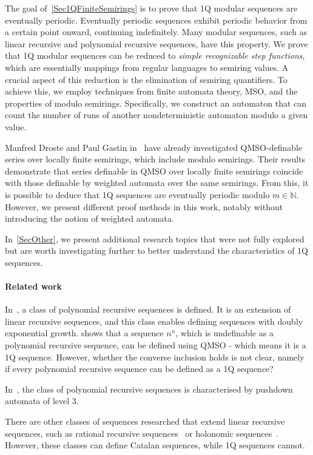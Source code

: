 \documentclass[en]{pracamgr}
\theoremstyle{definition}
\begin{document}
The goal of~\cref{Sec1QFiniteSemirings} is to prove that 1Q modular sequences are eventually periodic. Eventually periodic sequences exhibit periodic behavior from a certain point onward, continuing indefinitely. Many modular sequences, such as linear recursive and polynomial recursive sequences, have this property. We prove that 1Q modular sequences can be reduced to \emph{simple recognizable step functions}, which are essentially mappings from regular languages to semiring values. A crucial aspect of this reduction is the elimination of semiring quantifiers. To achieve this, we employ techniques from finite automata theory, MSO, and the properties of modulo semirings. Specifically, we construct an automaton that can count the number of runs of another nondeterministic automaton modulo a given value.

Manfred Droste and Paul Gastin in~\cite{DrosteG07} have already investigated QMSO-definable series over locally finite semirings, which include modulo semirings. Their results demonstrate that series definable in QMSO over locally finite semirings coincide with those definable by weighted automata over the same semirings. From this, it is possible to deduce that 1Q sequences are eventually periodic modulo $m \in \mathbb{N}$. However, we present different proof methods in this work, notably without introducing the notion of weighted automata.

In~\cref{SecOther}, we present additional research topics that were not fully explored but are worth investigating further to better understand the characteristics of 1Q sequences.

\paragraph*{Related work}
In~\cite{CadilhacMPPS20}, a class of polynomial recursive sequences is defined. It is an extension of linear recursive sequences, and this class enables defining sequences with doubly exponential growth. \cite{CadilhacMPPS20} shows that a sequence $n^n$, which is undefinable as a polynomial recursive sequence, can be defined using QMSO - which means it is a 1Q sequence. However, whether the converse inclusion holds is not clear, namely if every polynomial recursive sequence can be defined as a 1Q sequence?

In~\cite{Zerg}, the class of polynomial recursive sequences is characterised by pushdown automata of level 3.

There are other classes of sequences researched that extend linear recursive sequences, such as rational recursive sequences~\cite{ClementeDMP23} or holonomic sequences~\cite{KenisonKLLMOW021}. However, these classes can define Catalan sequences, while 1Q sequences cannot.
\end{document}
